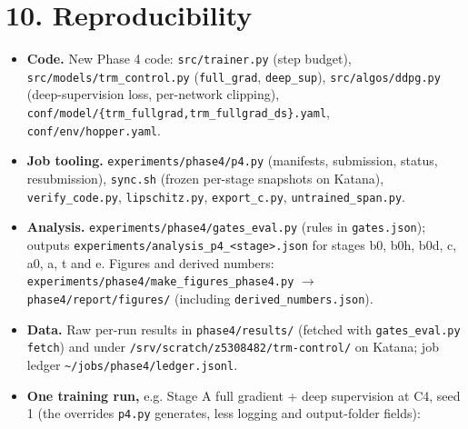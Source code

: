 \documentclass[11pt]{article}
\begin{document}
\section*{10. Reproducibility}



\begin{itemize}
\item \textbf{Code.} New Phase 4 code: \texttt{src/\allowbreak{}trainer.\allowbreak{}py} (step budget), \texttt{src/\allowbreak{}models/\allowbreak{}trm\_\allowbreak{}control.\allowbreak{}py} (\texttt{full\_grad}, \texttt{deep\_sup}), \texttt{src/\allowbreak{}algos/\allowbreak{}ddpg.\allowbreak{}py} (deep-supervision loss, per-network clipping), \texttt{conf/\allowbreak{}model/\allowbreak{}\{trm\_\allowbreak{}fullgrad,\allowbreak{}trm\_\allowbreak{}fullgrad\_\allowbreak{}ds\}.\allowbreak{}yaml}, \texttt{conf/\allowbreak{}env/\allowbreak{}hopper.\allowbreak{}yaml}.
\item \textbf{Job tooling.} \texttt{experiments/\allowbreak{}phase4/\allowbreak{}p4.\allowbreak{}py} (manifests, submission, status, resubmission), \texttt{sync.sh} (frozen per-stage snapshots on Katana), \texttt{verify\_\allowbreak{}code.\allowbreak{}py}, \texttt{lipschitz.py}, \texttt{export\_c.py}, \texttt{untrained\_\allowbreak{}span.\allowbreak{}py}.
\item \textbf{Analysis.} \texttt{experiments/\allowbreak{}phase4/\allowbreak{}gates\_\allowbreak{}eval.\allowbreak{}py} (rules in \texttt{gates.json}); outputs \texttt{experiments/\allowbreak{}analysis\_\allowbreak{}p4\_\allowbreak{}<stage>.\allowbreak{}json} for stages b0, b0h, b0d, c, a0, a, t and e. Figures and derived numbers: \texttt{experiments/\allowbreak{}phase4/\allowbreak{}make\_\allowbreak{}figures\_\allowbreak{}phase4.\allowbreak{}py} $\rightarrow$ \texttt{phase4/\allowbreak{}report/\allowbreak{}figures/\allowbreak{}} (including \texttt{derived\_\allowbreak{}numbers.\allowbreak{}json}).
\item \textbf{Data.} Raw per-run results in \texttt{phase4/\allowbreak{}results/\allowbreak{}} (fetched with \texttt{gates\_\allowbreak{}eval.\allowbreak{}py fetch}) and under \texttt{/\allowbreak{}srv/\allowbreak{}scratch/\allowbreak{}z5308482/\allowbreak{}trm-control/\allowbreak{}} on Katana; job ledger \texttt{\textasciitilde{}/\allowbreak{}jobs/\allowbreak{}phase4/\allowbreak{}ledger.\allowbreak{}jsonl}.
\item \textbf{One training run,} e.g. Stage A full gradient + deep supervision at C4, seed 1 (the overrides \texttt{p4.py} generates, less logging and output-folder fields):
\end{itemize}
\end{document}
